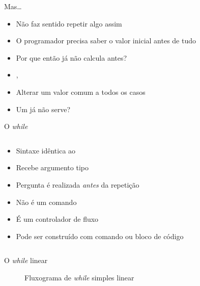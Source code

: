 \documentclass[14pt]{beamer}
\begin{document}
		\begin{frame}{Mas\dots}
			\begin{itemize}
				\presentationPause\item Não faz sentido repetir algo assim
				\presentationPause\item O programador precisa saber o valor inicial antes de tudo
				\presentationPause\item Por que então já não calcula antes?
				\presentationPause\item {}, 
				\presentationPause\item Alterar um valor comum a todos os casos
				\presentationPause\item Um  já não serve?
			\end{itemize}
		\end{frame}

		\begin{frame}{O \textit{while}}
			\begin{columns}
				\begin{column}{.65\textwidth}
					\begin{itemize}
						\presentationPause\item Sintaxe idêntica ao 
						\presentationPause\item Recebe argumento tipo 
						\presentationPause\item Pergunta é realizada \emph{antes} da repetição
						\presentationPause\item Não é um comando
						\presentationPause\item É um controlador de fluxo
						\presentationPause\item Pode ser construído com comando ou bloco de código
					\end{itemize}
					\presentationPause
				\end{column}
				\begin{column}{.35\textwidth}
					\presentationPause
				\end{column}
			\end{columns}
		\end{frame}

		\begin{frame}{O \textit{while} linear}
			\begin{figure}[H]
				\centering
				
				\caption{Fluxograma de \textit{while} simples linear}
				\label{fig.flow.while.line}
			\end{figure}
		\end{frame}
\end{document}
